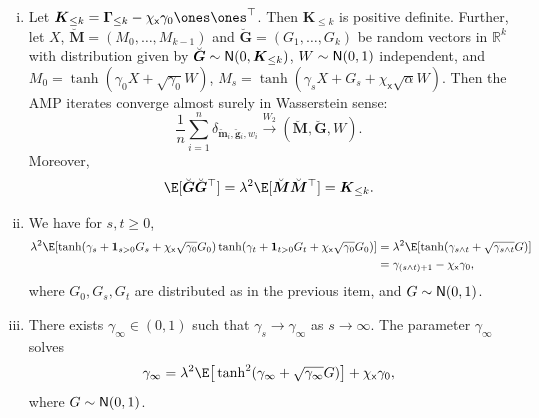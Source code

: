\documentclass[]{article}
\def\sx{{\mathsf x}}
\def\bGamma{\boldsymbol{\Gamma}}
\def\normal{{\sf N}}
\def\reals{{\mathbb R}}
\def\normal{{\sf N}}
\def\bK{\boldsymbol{K}}
\newcommand{\indic}[1]{\mathbf{1}_{#1}}
\def\Wconv{\stackrel{W_2}\rightarrow}
\def\brevebm{\breve{\boldsymbol{m}}{}}
\def\brevebM{\breve{\boldsymbol{M}}{}}
\def\brevebg{\breve{\boldsymbol{g}}{}}
\def\brevebG{\breve{\boldsymbol{G}}{}}
\begin{document}
\begin{proposition}
\begin{enumerate}[(i)]
        \item %
        Let $\bK_{\leq k} = \bGamma_{\leq k} - \chi_{\sx} \gamma_0 \ones\ones^\top$.
        Then $\bK_{\leq k}$ is positive definite.
        Further, let $X$, 
        $\brevebM = (M_0,\ldots,M_{k-1})$ and $\brevebG = (G_1,\ldots,G_k)$ be random vectors in $\reals^k$ with distribution given by 
        $\brevebG \sim \normal(0,\bK_{\leq k})$, 
        $W \sim \normal(0,1)$ independent, 
        and $M_0 = \tanh(\gamma_0X + \sqrt{\gamma_0}W)$, $M_s = \tanh(\gamma_sX + G_s + \chi_{\sx} \sqrt{\alpha}W)$.
        Then
        the AMP iterates converge almost surely in Wasserstein sense:
        \begin{equation}
            \frac1n \sum_{i=1}^n \delta_{\brevebm_i,\brevebg_i,w_i} 
                \Wconv
                (\brevebM,\brevebG,W).
        \end{equation}
        Moreover,
        \begin{equation}
            \E[\brevebG \brevebG^\top]
            =
            \lambda^2 \E[\brevebM\brevebM^\top]
            =
            \bK_{\leq k}.
        \end{equation}

        \item %
        We have for $s,t \geq 0$,
        \begin{equation}
        \begin{aligned}
            \lambda^2 \E[\tanh(\gamma_s + \indic{s > 0}G_s + \chi_{\sx} \sqrt{\gamma_0} G_0)\tanh(\gamma_t + \indic{t > 0}G_t + \chi_{\sx} \sqrt{\gamma_0} G_0)]
            &=
            \lambda^2 \E[\tanh(\gamma_{s \wedge t} + \sqrt{\gamma_{s \wedge t}}G)]
        \\
            &= \gamma_{(s \wedge t) + 1} - \chi_{\sx} \gamma_0,
        \end{aligned}
        \end{equation}
        where $G_0,G_s,G_t$ are distributed as in the previous item, and $G \sim \normal(0,1)$.

        \item %
        There exists $\gamma_\infty \in (0,1)$ such that $\gamma_s \rightarrow \gamma_\infty$ as $s \rightarrow \infty$. 
        The parameter $\gamma_\infty$ solves
        \begin{equation}
        \label{eq:def-gam-infty}
            \gamma_\infty = \lambda^2\E\big[\tanh^2(\gamma_\infty + \sqrt{\gamma_\infty} G)\big] + \chi_{\sx} \gamma_0,
        \end{equation}
        where $G \sim \normal(0,1)$.


\end{enumerate}
\end{proposition}
\end{document}
